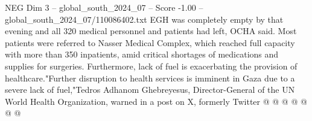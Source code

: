 \begin{textsample}{NEG Dim 3 – global\_south\_2024\_07 – Score -1.00 – global\_south\_2024\_07/110086402.txt}
EGH was completely empty by that evening and all 320 medical personnel and patients had left, OCHA said.
Most patients were referred to Nasser Medical Complex, which reached full capacity with more than 350 inpatients, amid critical shortages of medications and supplies for surgeries.
Furthermore, lack of fuel is exacerbating the provision of healthcare."Further disruption to health services is imminent in Gaza due to a severe lack of fuel,"Tedros Adhanom Ghebreyesus, Director-General of the UN World Health Organization, warned in a post on X, formerly Twitter @ @ @ @ @ @ @

\end{textsample}
